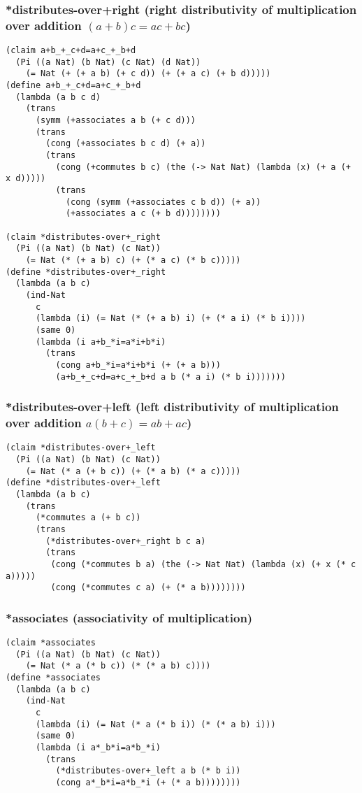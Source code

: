 \subsubsection{*distributes-over+right (right distributivity of multiplication over addition \((a + b)c = ac + bc\))} \label{code:*distributes-over+right}
\begin{verbatim}
(claim a+b_+_c+d=a+c_+_b+d
  (Pi ((a Nat) (b Nat) (c Nat) (d Nat))
    (= Nat (+ (+ a b) (+ c d)) (+ (+ a c) (+ b d)))))
(define a+b_+_c+d=a+c_+_b+d
  (lambda (a b c d)
    (trans
      (symm (+associates a b (+ c d)))
      (trans
        (cong (+associates b c d) (+ a))
        (trans
          (cong (+commutes b c) (the (-> Nat Nat) (lambda (x) (+ a (+ x d)))))
          (trans
            (cong (symm (+associates c b d)) (+ a))
            (+associates a c (+ b d))))))))

(claim *distributes-over+_right
  (Pi ((a Nat) (b Nat) (c Nat))
    (= Nat (* (+ a b) c) (+ (* a c) (* b c)))))
(define *distributes-over+_right
  (lambda (a b c)
    (ind-Nat
      c
      (lambda (i) (= Nat (* (+ a b) i) (+ (* a i) (* b i))))
      (same 0)
      (lambda (i a+b_*i=a*i+b*i)
        (trans
          (cong a+b_*i=a*i+b*i (+ (+ a b)))
          (a+b_+_c+d=a+c_+_b+d a b (* a i) (* b i)))))))
\end{verbatim}

\subsubsection{*distributes-over+left (left distributivity of multiplication over addition \(a(b + c) = ab + ac\))} \label{code:*distributes-over+left}
\begin{verbatim}
(claim *distributes-over+_left
  (Pi ((a Nat) (b Nat) (c Nat))
    (= Nat (* a (+ b c)) (+ (* a b) (* a c)))))
(define *distributes-over+_left
  (lambda (a b c)
    (trans
      (*commutes a (+ b c))
      (trans
        (*distributes-over+_right b c a)
        (trans
         (cong (*commutes b a) (the (-> Nat Nat) (lambda (x) (+ x (* c a)))))
         (cong (*commutes c a) (+ (* a b))))))))
\end{verbatim}

\subsubsection{*associates (associativity of multiplication)} \label{code:*associates}
\begin{verbatim}
(claim *associates
  (Pi ((a Nat) (b Nat) (c Nat))
    (= Nat (* a (* b c)) (* (* a b) c))))
(define *associates
  (lambda (a b c)
    (ind-Nat
      c
      (lambda (i) (= Nat (* a (* b i)) (* (* a b) i)))
      (same 0)
      (lambda (i a*_b*i=a*b_*i)
        (trans
          (*distributes-over+_left a b (* b i))
          (cong a*_b*i=a*b_*i (+ (* a b))))))))
\end{verbatim}

